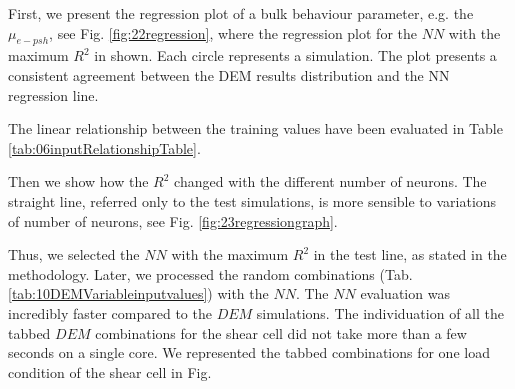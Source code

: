 First, we present the regression plot of a bulk behaviour parameter, e.g. the
$\mu_{e-psh}$, see Fig. \ref{fig:22regression}, where the regression plot for
the $NN$ with the maximum $R^2$ in shown. Each circle represents a simulation. 
The plot presents a consistent agreement between the DEM results distribution and the NN regression line.

The linear relationship between the
training values have been evaluated in Table \ref{tab:06inputRelationshipTable}.

Then we show how the $R^2$ changed with the different number of neurons. The
straight line, referred only to the test simulations, is more sensible to
variations of number of neurons, see Fig. \ref{fig:23regressiongraph}.

Thus, we selected the $NN$ with the maximum $R^2$ in the test line, as stated in the methodology.
Later, we processed the random combinations (Tab.
\ref{tab:10DEMVariableinputvalues}) with the $NN$.
The $NN$ evaluation was incredibly faster compared to the $DEM$ simulations. The
individuation of all the tabbed $DEM$ combinations for the shear cell did not take more than a few seconds on a single core. 
We represented the tabbed combinations for one load condition of the shear cell in Fig.

% 
% 
% 



% 
% 
% 
% 
% 
% 
